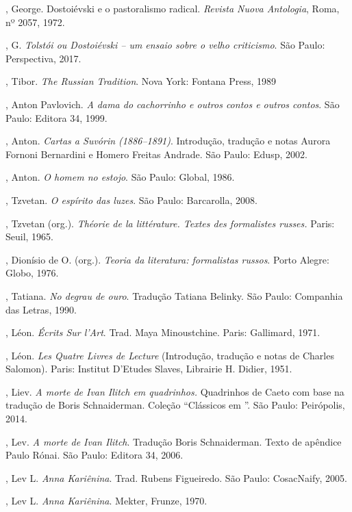 , George. Dostoiévski e o pastoralismo radical. \emph{Revista Nuova Antologia}, Roma, nº 2057, 1972.

, G. \emph{Tolstói ou Dostoiévski -- um ensaio sobre o velho criticismo}. São Paulo: Perspectiva, 2017.

, Tibor. \emph{The Russian Tradition}. Nova York: Fontana Press, 1989

, Anton Pavlovich. \emph{A dama do cachorrinho e outros contos e
outros contos}. São Paulo: Editora 34, 1999.

, Anton. \emph{Cartas a Suvórin (1886--1891)}. Introdução, tradução
e notas Aurora Fornoni Bernardini e Homero Freitas Andrade. São Paulo: Edusp, 2002.

, Anton. \emph{O homem no estojo}. São Paulo: Global, 1986.

, Tzvetan. \emph{O espírito das luzes}. São Paulo: Barcarolla, 2008.

, Tzvetan (org.). \emph{Théorie de la littérature. Textes des 
formalistes russes.} Paris: Seuil, 1965.

, Dionísio de O. (org.). \emph{Teoria da literatura: formalistas russos}. Porto Alegre: Globo, 1976.

, Tatiana. \emph{No degrau de ouro}. Tradução Tatiana Belinky. São Paulo: Companhia das Letras, 1990.

, Léon. \emph{Écrits Sur l'Art}. Trad. Maya Minoustchine. Paris:
Gallimard, 1971.

, Léon. \emph{Les Quatre Livres de Lecture} (Introdução,
tradução e notas de Charles Salomon). Paris: Institut D'Etudes Slaves,
Librairie H. Didier, 1951.

, Liev. \emph{A morte de Ivan Ilitch em quadrinhos.} Quadrinhos de Caeto com base na
tradução de Boris Schnaiderman. Coleção ``Clássicos em ''. São Paulo: Peirópolis, 2014.

, Lev. \emph{A morte de Ivan Ilitch}. Tradução Boris Schnaiderman. Texto de apêndice
Paulo Rónai. São Paulo: Editora 34, 2006.

, Lev L. \emph{Anna Kariênina}. Trad. Rubens Figueiredo. São
Paulo: CosacNaify, 2005.

, Lev L. \emph{Anna Kariênina}. Mekter, Frunze, 1970.


